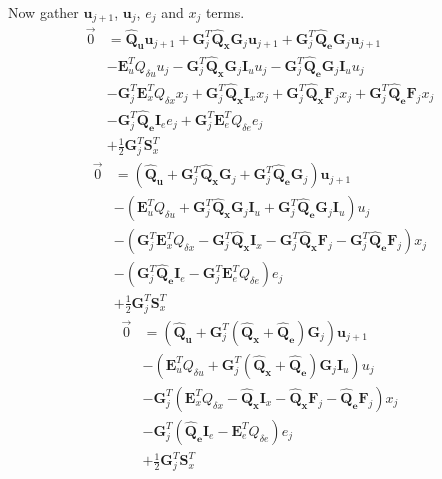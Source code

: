 \documentclass[landscape]{article}
\begin{document}
Now gather $\mathbf{u}_{j+1}$, $\mathbf{u}_{j}$, $e_j$ and $x_j$ terms.
\begin{align}
\vec{0}
& 
= \mathbf{\hat{Q}_u} \mathbf{u}_{j+1} 
+ \mathbf{G}_j^T \mathbf{\hat{Q}_x} \mathbf{G}_j \mathbf{u}_{j+1} 
+ \mathbf{G}_j^T \mathbf{\hat{Q}_e} \mathbf{G}_j \mathbf{u}_{j+1} \\
& 
- \mathbf{E}_u^T Q_{\delta u} u_j
- \mathbf{G}_j^T \mathbf{\hat{Q}_x} \mathbf{G}_j \mathbf{I}_u u_j  
- \mathbf{G}_j^T \mathbf{\hat{Q}_e} \mathbf{G}_j \mathbf{I}_u u_j \\
& 
- \mathbf{G}_j^T \mathbf{E}_x^T Q_{\delta x} x_j
+ \mathbf{G}_j^T \mathbf{\hat{Q}_x} \mathbf{I}_x x_j 
+ \mathbf{G}_j^T \mathbf{\hat{Q}_x} \mathbf{F}_j x_j 
+ \mathbf{G}_j^T \mathbf{\hat{Q}_e} \mathbf{F}_j x_j\\
&
- \mathbf{G}_j^T \mathbf{\hat{Q}_e} \mathbf{I}_e e_j 
+ \mathbf{G}_j^T \mathbf{E}_e^T Q_{\delta e} e_j\\
& + \frac{1}{2} \mathbf{G}_j^T \mathbf{S}_x^T
\end{align}
\begin{align}
\vec{0}
& 
=
\left(
\mathbf{\hat{Q}_u}
+ \mathbf{G}_j^T \mathbf{\hat{Q}_x} \mathbf{G}_j 
+ \mathbf{G}_j^T \mathbf{\hat{Q}_e} \mathbf{G}_j 
\right) \mathbf{u}_{j+1} \\
& 
- 
\left(
\mathbf{E}_u^T Q_{\delta u} 
+ \mathbf{G}_j^T \mathbf{\hat{Q}_x} \mathbf{G}_j \mathbf{I}_u 
+ \mathbf{G}_j^T \mathbf{\hat{Q}_e} \mathbf{G}_j \mathbf{I}_u 
\right) u_j \\
&
-
\left(
 \mathbf{G}_j^T \mathbf{E}_x^T Q_{\delta x} 
- \mathbf{G}_j^T \mathbf{\hat{Q}_x} \mathbf{I}_x  
- \mathbf{G}_j^T \mathbf{\hat{Q}_x} \mathbf{F}_j  
- \mathbf{G}_j^T \mathbf{\hat{Q}_e} \mathbf{F}_j 
\right) x_j\\
&
-
\left( \mathbf{G}_j^T \mathbf{\hat{Q}_e} \mathbf{I}_e 
- \mathbf{G}_j^T \mathbf{E}_e^T Q_{\delta e} 
\right) e_j\\
& + \frac{1}{2} \mathbf{G}_j^T \mathbf{S}_x^T
\end{align}
\begin{align}
\vec{0}
& 
=
\left(
\mathbf{\hat{Q}_u}
+ \mathbf{G}_j^T \left(\mathbf{\hat{Q}_x} + \mathbf{\hat{Q}_e} \right)\mathbf{G}_j 
\right) \mathbf{u}_{j+1} \\
& 
- 
\left(
\mathbf{E}_u^T Q_{\delta u} 
+ \mathbf{G}_j^T \left(\mathbf{\hat{Q}_x} +  \mathbf{\hat{Q}_e} \right) \mathbf{G}_j \mathbf{I}_u 
\right) u_j \\
&
- \mathbf{G}_j^T
\left(
\mathbf{E}_x^T Q_{\delta x} 
- \mathbf{\hat{Q}_x} \mathbf{I}_x  
- \mathbf{\hat{Q}_x} \mathbf{F}_j  
- \mathbf{\hat{Q}_e} \mathbf{F}_j 
\right) x_j\\
&
-\mathbf{G}_j^T
\left( \mathbf{\hat{Q}_e} \mathbf{I}_e  
- \mathbf{E}_e^T Q_{\delta e} 
\right) e_j\\
& + \frac{1}{2} \mathbf{G}_j^T \mathbf{S}_x^T
\end{align}
\end{document}
